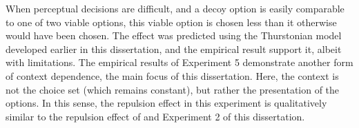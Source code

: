 When perceptual decisions are difficult, and a decoy option is easily comparable to one of two viable options, this viable option is chosen less than it otherwise would have been chosen. The effect was predicted using the Thurstonian model developed earlier in this dissertation, and the empirical result support it, albeit with limitations.  The empirical results of Experiment 5 demonstrate another form of context dependence, the main focus of this dissertation. Here, the context is not the choice set (which remains constant), but rather the presentation of the options. In this sense, the repulsion effect in this experiment is qualitatively similar to the repulsion effect of \textcite{spektorWhenGoodLooks2018b} and Experiment 2 of this dissertation.
